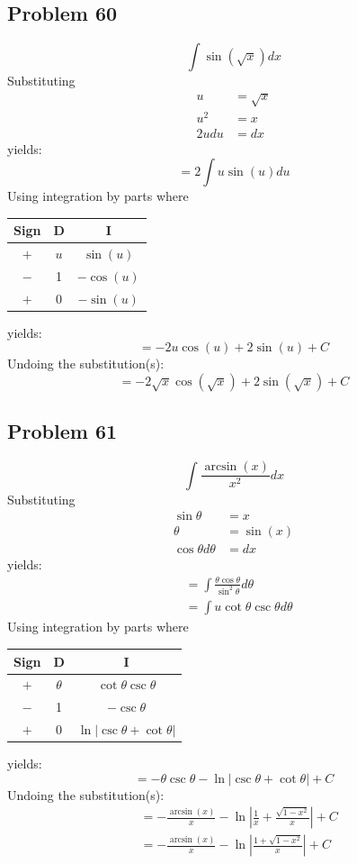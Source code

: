 \documentclass{article}
\begin{document}
\subsection*{Problem 60}
$$\int\sin\left(\sqrt{x}\right)dx$$
Substituting
\begin{align*}
u&=\sqrt{x} \\
u^2&=x \\
2udu&=dx
\end{align*}
yields:
$$=2\int u\sin(u)du$$
Using integration by parts where
\begin{center}
\begin{tabular}{ |c|c|c| } 
 \hline
 Sign & D & I \\
 \hline
 $+$ & $u$ & $\sin(u)$ \\ 
 $-$ & 1 & $-\cos(u)$ \\
 $+$ & 0 & $-\sin(u)$ \\
 \hline
\end{tabular}
\end{center}
yields:
$$=-2u\cos(u)+2\sin(u)+C$$
Undoing the substitution(s):
$$=-2\sqrt{x}\cos\left(\sqrt{x}\right)+2\sin\left(\sqrt{x}\right)+C$$
\subsection*{Problem 61}
$$\int\frac{\arcsin\left(x\right)}{x^2}dx$$
Substituting
\begin{align*}
\sin\theta&=x \\
\theta&=\sin(x) \\
\cos\theta d\theta&=dx
\end{align*}
yields:
\begin{align*}
&=\int\frac{\theta\cos\theta}{\sin^2\theta}d\theta \\
&=\int u\cot\theta\csc\theta d\theta
\end{align*}
Using integration by parts where
\begin{center}
\begin{tabular}{ |c|c|c| } 
 \hline
 Sign & D & I \\
 \hline
 $+$ & $\theta$ & $\cot\theta\csc\theta$ \\ 
 $-$ & 1 & $-\csc\theta$ \\
 $+$ & 0 & $\ln|\csc\theta+\cot\theta|$ \\
 \hline
\end{tabular}
\end{center}
yields:
$$=-\theta\csc\theta-\ln\left|\csc\theta+\cot\theta\right|+C$$
Undoing the substitution(s):
\begin{align*}
&=-\frac{\arcsin(x)}{x}-\ln\left|\frac{1}{x}+\frac{\sqrt{1-x^2}}{x}\right|+C \\
&=-\frac{\arcsin(x)}{x}-\ln\left|\frac{1+\sqrt{1-x^2}}{x}\right|+C
\end{align*}
\end{document}
